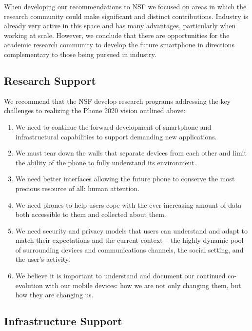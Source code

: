 When developing our recommendations to NSF we focused on areas in which the
research community could make significant and distinct contributions.
Industry is already very active in this space and has many advantages,
particularly when working at scale. However, we conclude that there are
opportunities for the academic research community to develop the future
smartphone in directions complementary to those being pursued in industry.

\subsection{Research Support}

We recommend that the NSF develop research programs addressing the key
challenges to realizing the Phone 2020 vision outlined above:

\begin{enumerate}

\item We need to continue the forward development of smartphone and
infrastructural capabilities to support demanding new applications.

\item We must tear down the walls that separate devices from each other and
limit the ability of the phone to fully understand its environment.

\item We need better interfaces allowing the future phone to conserve the
most precious resource of all: human attention.

\item We need phones to help users cope with the ever increasing amount of
data both accessible to them and collected about them.

\item We need security and privacy models that users can understand and adapt
to match their expectations and the current context – the highly dynamic pool
of surrounding devices and communications channels, the social setting, and
the user’s activity. 

\item We believe it is important to understand and document our continued
co-evolution with our mobile devices: how we are not only changing them, but
how they are changing us.

\end{enumerate}

\subsection{Infrastructure Support}

